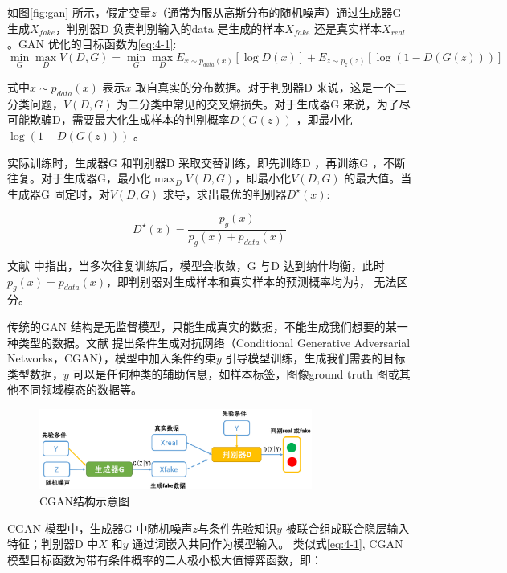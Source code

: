 如图\ref{fig:gan} 所示，假定变量$z$（通常为服从高斯分布的随机噪声）通过生成器G 生成$X_{fake}$，判别器D 负责判别输入的data 是生成的样本$X_{fake}$ 还是真实样本$X_{real}$。GAN 优化的目标函数为\ref{eq:4-1}:
\begin{equation}
  \label{eq:4-1}
  \mathop{\min}_{G} \mathop{\max}_{D} V(D,G) = \mathop{\min}_{G} \mathop{\max}_{D} E_{x \sim p_{data}(x)} [\log D(x)] + E_{z \sim p_{z}(z)}[ \log (1-D(G(z)))]
\end{equation}

式中$x \sim p_{data}(x)$ 表示$x$ 取自真实的分布数据。对于判别器D 来说，这是一个二分类问题，$ V(D,G)$ 为二分类中常见的交叉熵损失。对于生成器G 来说，为了尽可能欺骗D，需要最大化生成样本的判别概率$D(G(z))$ ，即最小化$\log (1-D(G(z)))$ 。

实际训练时，生成器G 和判别器D 采取交替训练，即先训练D ，再训练G ，不断往复。对于生成器G，最小化$\mathop{\max}_{D} V(D,G) $，即最小化$V(D,G)$ 的最大值。当生成器G 固定时，对$V(D,G)$ 求导，求出最优的判别器$D^{\star}(x)$:

\begin{equation}
  \label{eq:4-2}
  D^{\star}(x) = \frac{p_g(x)}{p_g(x)+p_{data}(x)}
\end{equation}

文献\cite{goodfellow2014generative} 中指出，当多次往复训练后，模型会收敛，G 与D 达到纳什均衡，此时$p_g(x) = p_{data}(x)$，即判别器对生成样本和真实样本的预测概率均为$\frac{1}{2}$， 无法区分。

传统的GAN 结构是无监督模型，只能生成真实的数据，不能生成我们想要的某一种类型的数据。文献\cite{mirza2014conditional} 提出条件生成对抗网络（Conditional Generative Adversarial Networks，CGAN），模型中加入条件约束$y$ 引导模型训练，生成我们需要的目标类型数据，$y$ 可以是任何种类的辅助信息，如样本标签，图像ground truth 图或其他不同领域模态的数据等。

\begin{figure}[htb]
  \centering
  \includegraphics[width=0.8\textwidth]{figures/cgan}
  \caption{CGAN结构示意图}\label{fig:cgan}
\end{figure}

CGAN 模型中，生成器G 中随机噪声$z$与条件先验知识$y$ 被联合组成联合隐层输入特征；判别器D 中$X$ 和$y$ 通过词嵌入共同作为模型输入。 类似式\ref{eq:4-1}, CGAN 模型目标函数为带有条件概率的二人极小极大值博弈函数，即：


